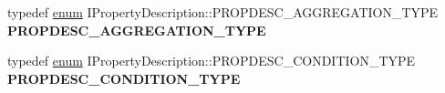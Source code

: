 \begin{DoxyCompactItemize}
\item 
\mbox{\label{interface_i_property_description_a7298887d01390205d810cfdc62837d4e}} 
typedef \hyperlink{interfaceenum}{enum} I\+Property\+Description\+::\+P\+R\+O\+P\+D\+E\+S\+C\+\_\+\+A\+G\+G\+R\+E\+G\+A\+T\+I\+O\+N\+\_\+\+T\+Y\+PE {\bfseries P\+R\+O\+P\+D\+E\+S\+C\+\_\+\+A\+G\+G\+R\+E\+G\+A\+T\+I\+O\+N\+\_\+\+T\+Y\+PE}
\item 
\mbox{\label{interface_i_property_description_a51097aaf3c2da34edd356da1c4437b32}} 
typedef \hyperlink{interfaceenum}{enum} I\+Property\+Description\+::\+P\+R\+O\+P\+D\+E\+S\+C\+\_\+\+C\+O\+N\+D\+I\+T\+I\+O\+N\+\_\+\+T\+Y\+PE {\bfseries P\+R\+O\+P\+D\+E\+S\+C\+\_\+\+C\+O\+N\+D\+I\+T\+I\+O\+N\+\_\+\+T\+Y\+PE}
\end{DoxyCompactItemize}
